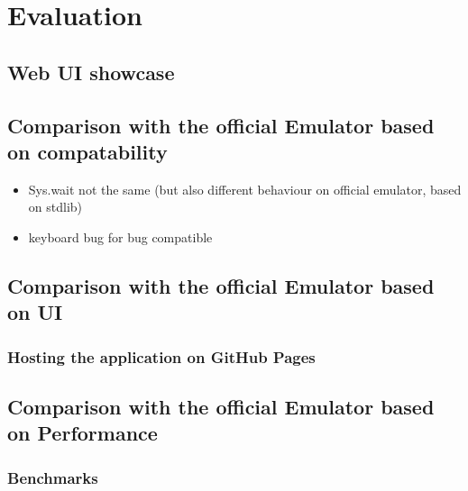 \section{Evaluation}
\subsection{Web UI showcase}
\subsection{Comparison with the official Emulator based on compatability}
\begin{itemize}
  \item Sys.wait not the same (but also different behaviour on official emulator, based on stdlib)
  \item keyboard bug for bug compatible
\end{itemize}

\subsection{Comparison with the official Emulator based on UI}
\subsubsection{Hosting the application on GitHub Pages}
\subsection{Comparison with the official Emulator based on Performance}
\subsubsection{Benchmarks} \label{sec:benchmarks}

